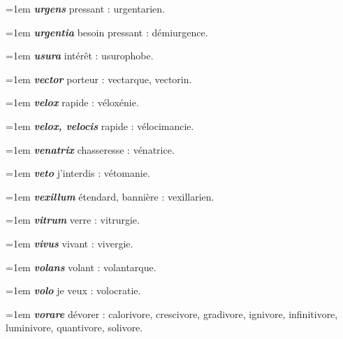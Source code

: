 \hangindent=1em \textbf{\textit{urgens}} pressant : urgentarien.\par
\hangindent=1em \textbf{\textit{urgentia}} besoin pressant : démiurgence.\par
\hangindent=1em \textbf{\textit{usura}} intérêt : usurophobe.\par
\hangindent=1em \textbf{\textit{vector}} porteur : vectarque, vectorin.\par
\hangindent=1em \textbf{\textit{velox}} rapide : véloxénie.\par
\hangindent=1em \textbf{\textit{velox, velocis}} rapide : vélocimancie.\par
\hangindent=1em \textbf{\textit{venatrix}} chasseresse : vénatrice.\par
\hangindent=1em \textbf{\textit{veto}} j'interdis : vétomanie.\par
\hangindent=1em \textbf{\textit{vexillum}} étendard, bannière : vexillarien.\par
\hangindent=1em \textbf{\textit{vitrum}} verre : vitrurgie.\par
\hangindent=1em \textbf{\textit{vivus}} vivant : vivergie.\par
\hangindent=1em \textbf{\textit{volans}} volant : volantarque.\par
\hangindent=1em \textbf{\textit{volo}} je veux : volocratie.\par
\hangindent=1em \textbf{\textit{vorare}} dévorer : calorivore, crescivore, gradivore, ignivore, infinitivore, luminivore, quantivore, solivore.\par
